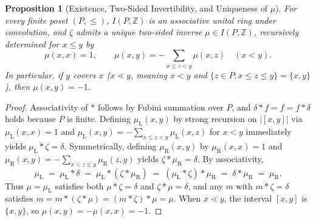 \documentclass[11pt]{article}
\newtheorem{proposition}[theorem]{Proposition}
\theoremstyle{definition}
\theoremstyle{remark}
\newcommand{\Z}{\mathbb{Z}}
\begin{document}
\begin{proposition}[Existence, Two-Sided Invertibility, and Uniqueness of $\mu$]
\label{prop:mobius}
For every finite poset $(P, \le)$, $I(P, \Z)$ is an associative unital ring under convolution, and $\zeta$ admits a unique two-sided inverse $\mu \in I(P, \Z)$, recursively determined for $x \le y$ by
\[
  \mu(x, x) = 1, \qquad \mu(x, y) = -\sum_{x \le z < y} \mu(x, z) \quad (x < y).
\]
In particular, if $y$ covers $x$ ($x \lessdot y$, meaning $x < y$ and $\{z \in P : x \le z \le y\} = \{x, y\}$), then $\mu(x, y) = -1$.
\end{proposition}

\begin{proof}
Associativity of $*$ follows by Fubini summation over $P$, and $\delta * f = f = f * \delta$ holds because $P$ is finite. Defining $\mu_{\mathrm{L}}(x,y)$ by strong recursion on $|[x,y]|$ via $\mu_{\mathrm{L}}(x,x)=1$ and $\mu_{\mathrm{L}}(x,y) = -\sum_{x \le z < y} \mu_{\mathrm{L}}(x,z)$ for $x<y$ immediately yields $\mu_{\mathrm{L}} * \zeta = \delta$. Symmetrically, defining $\mu_{\mathrm{R}}(x,y)$ by $\mu_{\mathrm{R}}(x,x)=1$ and $\mu_{\mathrm{R}}(x,y) = -\sum_{x < z \le y} \mu_{\mathrm{R}}(z,y)$ yields $\zeta * \mu_{\mathrm{R}} = \delta$. By associativity,
\[
  \mu_{\mathrm{L}} \;=\; \mu_{\mathrm{L}} * \delta \;=\; \mu_{\mathrm{L}} * (\zeta * \mu_{\mathrm{R}}) \;=\; (\mu_{\mathrm{L}} * \zeta) * \mu_{\mathrm{R}} \;=\; \delta * \mu_{\mathrm{R}} \;=\; \mu_{\mathrm{R}}.
\]
Thus $\mu = \mu_{\mathrm{L}}$ satisfies both $\mu * \zeta = \delta$ and $\zeta * \mu = \delta$, and any $m$ with $m * \zeta = \delta$ satisfies $m = m * (\zeta * \mu) = (m * \zeta) * \mu = \mu$. When $x \lessdot y$, the interval $[x,y]$ is $\{x,y\}$, so $\mu(x,y) = -\mu(x,x) = -1$.
\end{proof}
\end{document}
